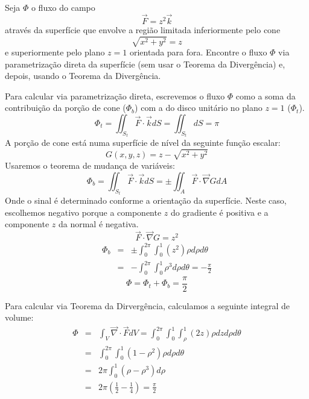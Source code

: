 \begin{exeresol} Seja $\Phi$ o fluxo do campo
   $$\vec{F}=z^2\vec{k}$$
   através da superfície que envolve a região limitada inferiormente pelo cone
   $$\sqrt{x^2+y^2}=z$$
   e superiormente pelo plano $z=1$ orientada para fora. 
   Encontre  o fluxo $\Phi$ via parametrização direta da superfície (sem usar o Teorema da Divergência) e, depois,  usando o Teorema da Divergência.
\end{exeresol}
\begin{resol}
   Para calcular via parametrização direta, escrevemos o fluxo $\Phi$ como a soma da contribuição da porção de cone ($\Phi_b$) com a do disco unitário no plano $z=1$ ($\Phi_t$).
$$\Phi_t = \iint_{S_t}\vec{F}\cdot\vec{k}dS =  \iint_{S_t}dS=\pi $$
A porção de cone está numa superfície de nível da seguinte função escalar:
$$G(x,y,z)=z-\sqrt{x^2+y^2} $$
Usaremos o teorema de mudança de variáveis:
$$\Phi_b = \iint_{S_t}\vec{F}\cdot\vec{k}dS =  \pm \iint_{A}\vec{F}\cdot \vec{\nabla}GdA $$
Onde o sinal é determinado conforme a orientação da superfície. Neste caso, escolhemos negativo porque a componente $z$ do gradiente é positiva e a componente $z$ da normal é negativa.
$$\vec{F}\cdot \vec{\nabla}G=z^2$$
\begin{eqnarray*}
 \Phi_b &=&\pm \int_0^{2\pi}\int_0^1(z^2)\rho d\rho d\theta\\
 &=&-\int_0^{2\pi}\int_0^1\rho^3 d\rho d\theta=-\frac{\pi}{2}
\end{eqnarray*}
$$\Phi=\Phi_t+\Phi_b=\frac{\pi}{2}$$

Para calcular via Teorema da Dirvergência, calculamos a seguinte integral de volume:
\begin{eqnarray*}
   \Phi&=&\int_V \vec{\nabla}\cdot \vec{F}dV= \int_0^{2\pi}\int_0^1\int_\rho^1 (2z)\rho dz d\rho d\theta\\
   &=& \int_0^{2\pi}\int_0^1(1-\rho^2)\rho d\rho d\theta\\
   &=& {2\pi}\int_0^1(\rho-\rho^3) d\rho \\
   &=&{2\pi}\left(\frac{1}{2}-\frac{1}{4}\right)=\frac{\pi}{2}
  \end{eqnarray*}
  
\end{resol}

